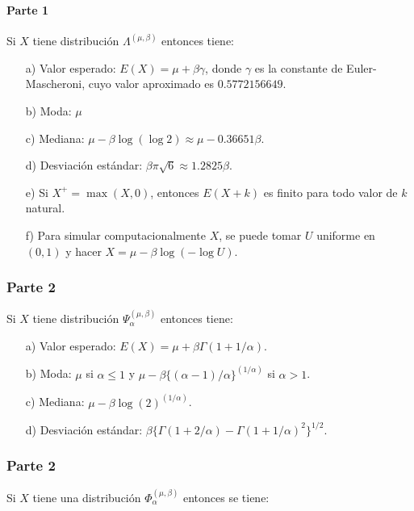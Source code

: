 \documentclass[
]{book}
\theoremstyle{definition}
\theoremstyle{definition}
\theoremstyle{definition}
\theoremstyle{definition}
\theoremstyle{remark}
\begin{document}
\paragraph{Parte 1}\label{parte-1}

Si \(X\) tiene distribución \(\Lambda^{(\mu,\beta)}\) entonces tiene:

\begin{itemize}
  \item[a)] Valor esperado: $E(X) = \mu + \beta\gamma$, donde $\gamma$ es la constante de Euler-Mascheroni, cuyo valor aproximado es $0.5772156649$.
  \item[b)] Moda: $\mu$
  \item[c)] Mediana: $\mu - \beta \log(\log 2) \approx \mu - 0.36651 \beta$.
  \item[d)] Desviación estándar: $\beta \pi \sqrt{6} \approx 1.2825 \beta$.
  \item[e)] Si $X^+ = \max(X,0)$, entonces $E(X+k)$ es finito para todo valor de $k$ natural.
  \item[f)] Para simular computacionalmente $X$, se puede tomar $U$ uniforme en $(0,1)$ y hacer $X = \mu - \beta \log(-\log U)$.
\end{itemize}

\subsubsection{Parte 2}\label{parte-2}

Si \(X\) tiene distribución \(\Psi_{\alpha}^{(\mu,\beta)}\) entonces tiene:

\begin{itemize}
  \item[a)] Valor esperado: $E(X) = \mu + \beta\Gamma(1+1/\alpha)$.
  \item[b)] Moda: $\mu$ si $\alpha\leq 1$ y $\mu-\beta\{(\alpha-1)/\alpha\}^{(1/\alpha)}$ si $\alpha>1$.
  \item[c)] Mediana: $\mu - \beta \log(2)^{(1/\alpha)}$.
  \item[d)] Desviación estándar: $\beta\{\Gamma(1+2/\alpha)-\Gamma(1+1/\alpha)^2\}^{1/2}$.
\end{itemize}

\subsubsection{Parte 2}\label{parte-2-1}

Si \(X\) tiene una distribución \(\Phi_{\alpha}^{(\mu, \beta)}\) entonces se tiene:
\end{document}
